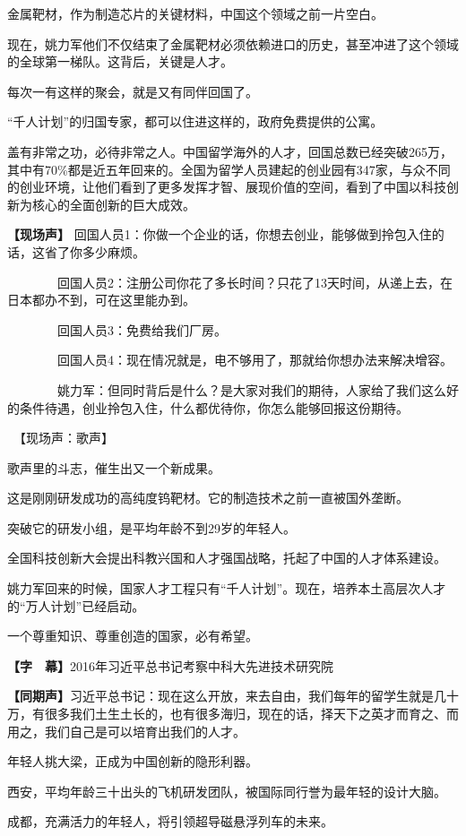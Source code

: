 \documentclass{ctexart}
\newcommand{\zkh}[1]{\textbf{\hspace{-2.7em} 【#1】}}
\begin{document}
 金属靶材，作为制造芯片的关键材料，中国这个领域之前一片空白。

现在，姚力军他们不仅结束了金属靶材必须依赖进口的历史，甚至冲进了这个领域的全球第一梯队。这背后，关键是人才。

 每次一有这样的聚会，就是又有同伴回国了。

 ``千人计划''的归国专家，都可以住进这样的，政府免费提供的公寓。

盖有非常之功，必待非常之人。中国留学海外的人才，回国总数已经突破265万，其中有70{\%}都是近五年回来的。全国为留学人员建起的创业园有347家，与众不同的创业环境，让他们看到了更多发挥才智、展现价值的空间，看到了中国以科技创新为核心的全面创新的巨大成效。

 \zkh{现场声} 
回国人员1：你做一个企业的话，你想去创业，能够做到拎包入住的话，这省了你多少麻烦。

　　　　回国人员2：注册公司你花了多长时间？只花了13天时间，从递上去，在日本都办不到，可在这里能办到。

　　　　回国人员3：免费给我们厂房。

　　　　回国人员4：现在情况就是，电不够用了，那就给你想办法来解决增容。

　　　　姚力军：但同时背后是什么？是大家对我们的期待，人家给了我们这么好的条件待遇，创业拎包入住，什么都优待你，你怎么能够回报这份期待。

 　【现场声：歌声】 
 
 歌声里的斗志，催生出又一个新成果。

 这是刚刚研发成功的高纯度钨靶材。它的制造技术之前一直被国外垄断。

 突破它的研发小组，是平均年龄不到29岁的年轻人。

 全国科技创新大会提出科教兴国和人才强国战略，托起了中国的人才体系建设。

姚力军回来的时候，国家人才工程只有``千人计划''。现在，培养本土高层次人才的``万人计划''已经启动。

 一个尊重知识、尊重创造的国家，必有希望。

 \zkh{字　幕}2016年习近平总书记考察中科大先进技术研究院

 \zkh{同期声}习近平总书记：现在这么开放，来去自由，我们每年的留学生就是几十万，有很多我们土生土长的，也有很多海归，现在的话，择天下之英才而育之、而用之，我们自己是可以培育出我们的人才。

 年轻人挑大梁，正成为中国创新的隐形利器。

 西安，平均年龄三十出头的飞机研发团队，被国际同行誉为最年轻的设计大脑。

 成都，充满活力的年轻人，将引领超导磁悬浮列车的未来。
\end{document}
